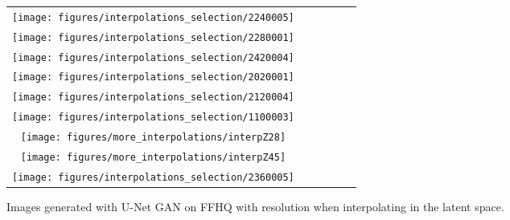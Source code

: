 \documentclass[10pt,twocolumn,letterpaper]{article}
\begin{document}
\begin{figure*}
\begin{centering}
\setlength{\tabcolsep}{0.1em}
\renewcommand{\arraystretch}{0}
\par\end{centering}
\begin{centering}
\vspace{-1.5em}
\hfill{}\begin{tabular}{c@{\hskip 0.05in}c@{\hskip 0.05in}c@{\hskip 0.05in}c@{\hskip 0.05in}c@{\hskip 0.05in}c}


\texttt{[image: figures/interpolations\_selection/2240005]}\tabularnewline
\texttt{[image: figures/interpolations\_selection/2280001]}\tabularnewline
\texttt{[image: figures/interpolations\_selection/2420004]}\tabularnewline
\texttt{[image: figures/interpolations\_selection/2020001]}\tabularnewline
\texttt{[image: figures/interpolations\_selection/2120004]}\tabularnewline

\texttt{[image: figures/interpolations\_selection/1100003]}\tabularnewline
\texttt{[image: figures/more\_interpolations/interpZ28]}\tabularnewline
\texttt{[image: figures/more\_interpolations/interpZ45]}\tabularnewline
\texttt{[image: figures/interpolations\_selection/2360005]}\tabularnewline







\end{tabular}\hfill{}
\par\end{centering}
\vspace{-0.5em}
\caption{\label{fig:more_ffhq_interpolations} Images generated with U-Net GAN on FFHQ with resolution  when interpolating in the latent space.} \vspace{0em}
\end{figure*}
 
\end{document}
